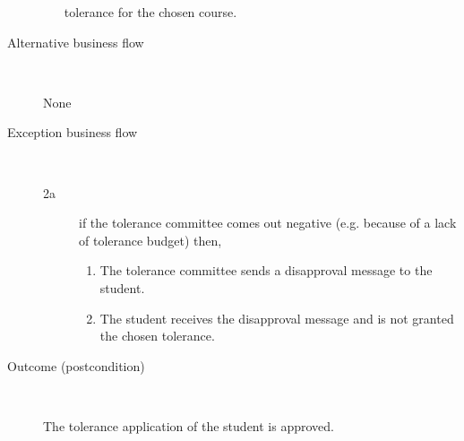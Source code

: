 \begin{description}
\begin{enumerate}
	  	tolerance for the chosen course.
	\end{enumerate}
	\item[Alternative business flow] \ 
		\par None
	\item[Exception business flow] \ 
	\begin{description}
		\item[2a] if the tolerance committee comes out negative (e.g. because of a
		lack of tolerance budget) then,
		\begin{enumerate}
		  \item The tolerance committee sends a disapproval message to the student.
		  \item The student receives the disapproval message and is not granted the
		  chosen tolerance.
		\end{enumerate}
	\end{description}
	\item[Outcome (postcondition)] \ 
		\par The tolerance application of the student is approved.
\end{description}
